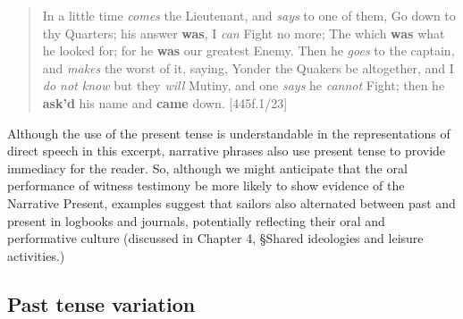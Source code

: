 \begin{quotation}
In a little time \textit{comes} the Lieutenant, and \textit{says} to one of them, Go down to thy Quarters; his answer \textbf{was}, I \textit{can} Fight no more; The which \textbf{was} what he looked for; for he \textbf{was} our greatest Enemy. Then he \textit{goes} to the captain, and \textit{makes} the worst of it, saying, Yonder the Quakers be altogether, and I \textit{do not know} but they \textit{will} Mutiny, and one \textit{says} he \textit{cannot} Fight; then he \textbf{ask’d} his name and \textbf{came} down. [445f.1/23]\end{quotation}

Although the use of the present tense is understandable in the representations of direct speech in this excerpt, narrative phrases also use present tense to provide immediacy for the reader. So, although we might anticipate that the oral performance of witness testimony be more likely to show evidence of the Narrative Present, examples suggest that sailors also alternated between past and present in logbooks and journals, potentially reflecting their oral and performative culture (discussed in Chapter 4, §Shared ideologies and leisure activities.) 

\subsection{{Past} {tense} {variation} }%

